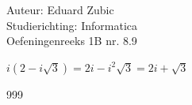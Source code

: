 \documentclass[a4paper]{article}
\begin{document}
  
\noindent \large Auteur: Eduard Zubic \\
\noindent \large Studierichting: Informatica\\
\noindent \large Oefeningenreeks 1B nr. 8.9\\

\medskip

\normalsize

$i(2 - i\sqrt{3}) = 2i - i^2\sqrt{3} = 2i + \sqrt{3}$

\begin{thebibliography}{999}
\end{thebibliography}
\end{document}
